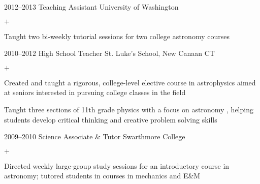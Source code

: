 \documentclass[]{luger-cv} %
\begin{document}
\begin{entrylist}

        \entry
        {2012--2013}
        {Teaching Assistant}
        {University of Washington}
        {%
            \vspace{-1em}
            \begin{list}{$+$}{\cvlist}
                \item Taught two bi-weekly tutorial sessions for two college astronomy courses
            \end{list}
        }


    \fi

    \ifdefined \onepage \else
\end{entrylist}
%
%
\begin{entrylist}
    \fi


    \entry
    {2010--2012}
    {High School Teacher}
    {St. Luke's School, New Canaan CT}
    {%
        \vspace{-1em}
        \begin{list}{$+$}{\cvlist}
            \item Created and taught a rigorous, college-level elective course in astrophysics
                  aimed at seniors interested in pursuing college classes in the field
            \item Taught three sections of 11th grade physics with a focus on
                  astronomy
                  \ifdefined \onepage \else
                      , helping students develop critical thinking and creative
                      problem solving skills
                  \fi
        \end{list}
    }


    \ifdefined \onepage \else
        \entry
        {2009--2010}
        {Science Associate \& Tutor}
        {Swarthmore College}
        {%
            \vspace{-1em}
            \begin{list}{$+$}{\cvlist}
                \item Directed weekly large-group study sessions for an introductory course in
                      astronomy; tutored students in courses in mechanics and E\&M
            \end{list}
        }
    \fi


\end{entrylist}
\end{document}
